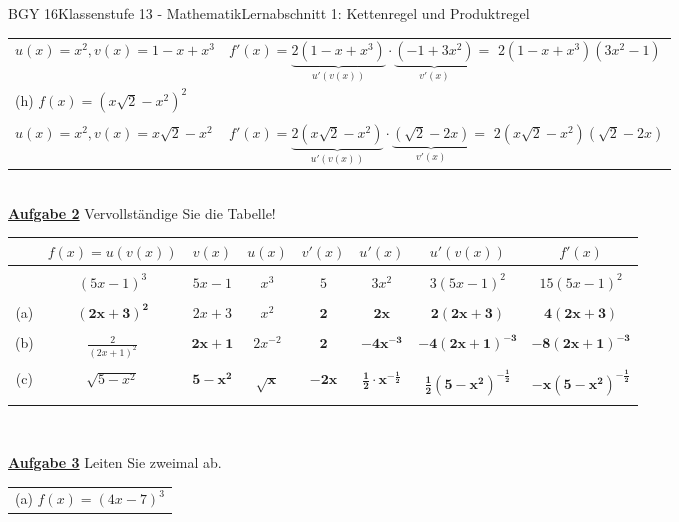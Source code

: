 \documentclass[oneside,openany,headings=optiontotoc,11pt,numbers=noenddot]{scrreprt}
\begin{document}
\begin{worksheet}{BGY 16}{Klassenstufe 13 - Mathematik}{Lernabschnitt 1: Kettenregel und Produktregel}
\begin{framed}
\begin{tabularx}{\textwidth}{lX}
				\(u(x) = x^2, v(x) = 1-x+x^3\) & \(f'(x) = \underbrace{2(1-x+x^3)}_{u'(v(x))}\cdot\underbrace{(-1+3x^2)}_{v'(x)} =\) \colorbox{green!10}{\(2(1-x+x^3)(3x^2-1)\)}\\
				(h) \(f(x) = (x\sqrt{2}-x^2)^2\)\\
				\\
				\(u(x) = x^2, v(x) = x\sqrt{2}-x^2\) & \(f'(x) =  \underbrace{2(x\sqrt{2}-x^2)}_{u'(v(x))}\cdot\underbrace{(\sqrt{2}-2x)}_{v'(x)} =\) \colorbox{green!10}{\(2(x\sqrt{2}-x^2)(\sqrt{2}-2x)\)}\\
			\end{tabularx}\\
			\newpage
			\textbf{\underline{Aufgabe 2}} Vervollständige Sie die Tabelle!\\
			\par\noindent
			\begin{tabularx}{\textwidth}{c|c|c|c|c|c|c|c}
				& \(f(x) = u(v(x))\) & \(v(x)\) & \(u(x)\) & \(v'(x)\) & \(u'(x)\) & \(u'(v(x))\) & \(f'(x)\)\\
				\hline
				\\
				& \((5x-1)^3\) & \(5x-1\) & \(x^3\) & \(5\) & \(3x^2\) & \(3(5x-1)^2\) & \(15(5x-1)^2\)\\
				\hline
				\\
				(a) & \(\mathbf{(2x+3)^2}\)& \(2x+3\) & \(x^2\) & \(\mathbf{2}\)& \(\mathbf{2x}\)& \(\mathbf{2(2x+3)}\) & \(\mathbf{4(2x+3)}\)\\
				\hline
				\\
				(b) & \( \frac{2}{(2x+1)^2}\) & \(\mathbf{2x+1}\) & \(2x^{-2}\) & \(\mathbf{2}\) & \(\mathbf{-4x^{-3}}\) & \(\mathbf{-4(2x+1)^{-3}}\) & \(\mathbf{-8(2x+1)^{-3}}\)\\
				\hline
				\\
				(c) & \(\sqrt{5-x^2}\) & \(\mathbf{5-x^2}\) & \(\mathbf{\sqrt{x}}\) & \(\mathbf{-2x}\) & \(\mathbf{\frac{1}{2}\cdot{}x^{-\frac{1}{2}}}\)& \(\mathbf{\frac{1}{2}(5-x^2)^{-\frac{1}{2}}}\) & \(\mathbf{-x(5-x^2)^{-\frac{1}{2}}}\)\\
				\hline
				\\
			\end{tabularx}\\
			\par\noindent
			\textbf{\underline{Aufgabe 3}} Leiten Sie zweimal ab.\\
			\par
			\begin{tabularx}{\textwidth}{l}
				(a) \(f(x) = (4x-7)^3\)\\

\end{tabularx}
\end{framed}
\end{worksheet}
\end{document}
